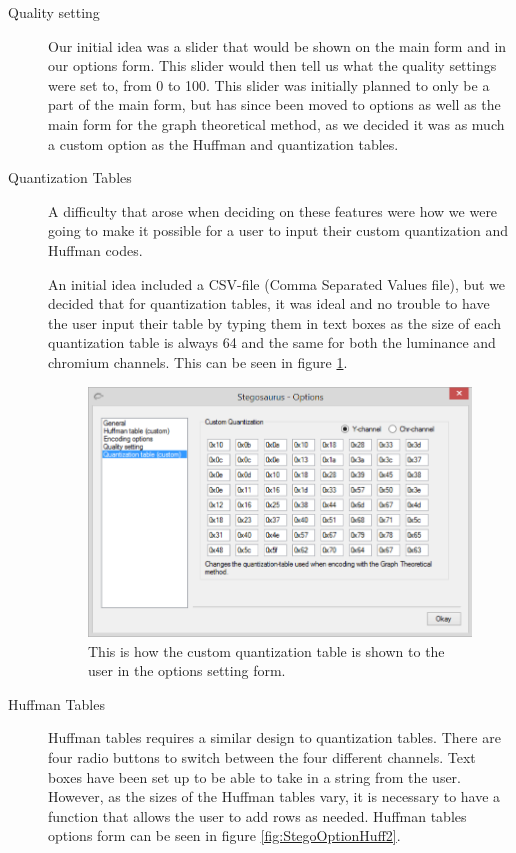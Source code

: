\begin{description}
\item[Quality setting]
Our initial idea was a slider that would be shown on the main form and in our options form.
This slider would then tell us what the quality settings were set to, from 0 to 100.
This slider was initially planned to only be a part of the main form, but has since been moved to options as well as the main form for the graph theoretical method, as we decided it was as much a custom option as the Huffman and quantization tables.

\item[Quantization Tables]
A difficulty that arose when deciding on these features were how we were going to make it possible for a user to input their custom quantization and Huffman codes.

An initial idea included a CSV-file (Comma Separated Values file), but we decided that for quantization tables, it was ideal and no trouble to have the user input their table by typing them in text boxes as the size of each quantization table is always 64 and the same for both the luminance and chromium channels. This can be seen in figure \ref{fig:StegoOptionQuant}.


\begin{figure}
	\centering
	\includegraphics[width=1\textwidth]{figures/StegoOptionQuant.png}
	\caption{This is how the custom quantization table is shown to the user in the options setting form.}
	\label{fig:StegoOptionQuant}
\end{figure}

\item[Huffman Tables]

Huffman tables requires a similar design to quantization tables. There are four radio buttons to switch between the four different channels. Text boxes have been set up to be able to take in a string from the user. However, as the sizes of the Huffman tables vary, it is necessary to have a function that allows the user to add rows as needed. Huffman tables options form can be seen in figure \ref{fig:StegoOptionHuff2}.



\end{description}
